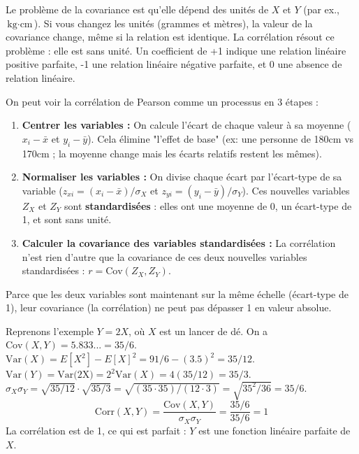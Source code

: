 \begin{intuitionbox}
Le problème de la covariance est qu'elle dépend des unités de $X$ et $Y$ (par ex., $\text{kg} \cdot \text{cm}$). Si vous changez les unités (grammes et mètres), la valeur de la covariance change, même si la relation est identique. La corrélation résout ce problème : elle est sans unité. Un coefficient de +1 indique une relation linéaire positive parfaite, -1 une relation linéaire négative parfaite, et 0 une absence de relation linéaire.
\end{intuitionbox}

\begin{intuitionbox}
On peut voir la corrélation de Pearson comme un processus en 3 étapes :
\begin{enumerate}
    \item \textbf{Centrer les variables :} On calcule l'écart de chaque valeur à sa moyenne ($x_i - \bar{x}$ et $y_i - \bar{y}$). Cela élimine "l'effet de base" (ex: une personne de 180cm vs 170cm ; la moyenne change mais les écarts relatifs restent les mêmes).
    \item \textbf{Normaliser les variables :} On divise chaque écart par l'écart-type de sa variable ($z_{xi} = (x_i - \bar{x})/\sigma_X$ et $z_{yi} = (y_i - \bar{y})/\sigma_Y$). Ces nouvelles variables $Z_X$ et $Z_Y$ sont \textbf{standardisées} : elles ont une moyenne de 0, un écart-type de 1, et sont sans unité.
    \item \textbf{Calculer la covariance des variables standardisées :} La corrélation n'est rien d'autre que la covariance de ces deux nouvelles variables standardisées : $r = \text{Cov}(Z_X, Z_Y)$.
\end{enumerate}
Parce que les deux variables sont maintenant sur la même échelle (écart-type de 1), leur covariance (la corrélation) ne peut pas dépasser 1 en valeur absolue.
\end{intuitionbox}

\begin{examplebox}
Reprenons l'exemple $Y=2X$, où $X$ est un lancer de dé.
On a $\text{Cov}(X,Y) = 5.833... = 35/6$.
$\text{Var}(X) = E[X^2] - E[X]^2 = 91/6 - (3.5)^2 = 35/12$.
$\text{Var}(Y) = \text{Var(2X)} = 2^2 \text{Var}(X) = 4(35/12) = 35/3$.
$\sigma_X \sigma_Y = \sqrt{35/12} \cdot \sqrt{35/3} = \sqrt{(35 \cdot 35) / (12 \cdot 3)} = \sqrt{35^2 / 36} = 35/6$.
$$\text{Corr}(X,Y) = \frac{\text{Cov}(X,Y)}{\sigma_X \sigma_Y} = \frac{35/6}{35/6} = 1$$
La corrélation est de 1, ce qui est parfait : $Y$ est une fonction linéaire parfaite de $X$.
\end{examplebox}


